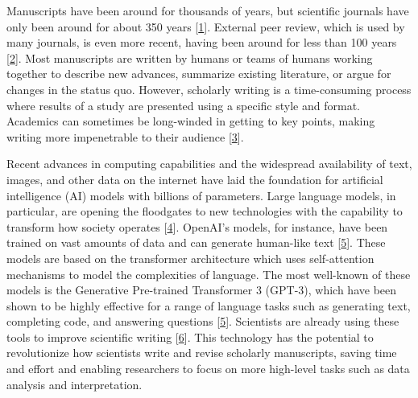 \documentclass[
]{article}
\begin{document}
Manuscripts have been around for thousands of years, but scientific journals have only been around for about 350 years {[}\protect\hyperlink{ref-F3iZfGUC}{1}{]}.
External peer review, which is used by many journals, is even more recent, having been around for less than 100 years {[}\protect\hyperlink{ref-1HMhNrQq1}{2}{]}.
Most manuscripts are written by humans or teams of humans working together to describe new advances, summarize existing literature, or argue for changes in the status quo.
However, scholarly writing is a time-consuming process where results of a study are presented using a specific style and format.
Academics can sometimes be long-winded in getting to key points, making writing more impenetrable to their audience {[}\protect\hyperlink{ref-19YWsShi0}{3}{]}.

Recent advances in computing capabilities and the widespread availability of text, images, and other data on the internet have laid the foundation for artificial intelligence (AI) models with billions of parameters.
Large language models, in particular, are opening the floodgates to new technologies with the capability to transform how society operates {[}\protect\hyperlink{ref-xq1uEbPa}{4}{]}.
OpenAI's models, for instance, have been trained on vast amounts of data and can generate human-like text {[}\protect\hyperlink{ref-bYOaJHMe}{5}{]}.
These models are based on the transformer architecture which uses self-attention mechanisms to model the complexities of language.
The most well-known of these models is the Generative Pre-trained Transformer 3 (GPT-3), which have been shown to be highly effective for a range of language tasks such as generating text, completing code, and answering questions {[}\protect\hyperlink{ref-bYOaJHMe}{5}{]}.
Scientists are already using these tools to improve scientific writing {[}\protect\hyperlink{ref-Svww2RUh}{6}{]}.
This technology has the potential to revolutionize how scientists write and revise scholarly manuscripts, saving time and effort and enabling researchers to focus on more high-level tasks such as data analysis and interpretation.
\end{document}
